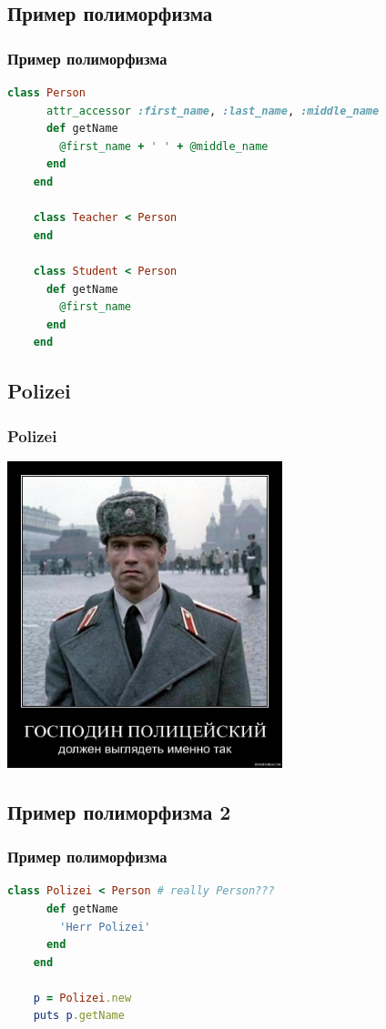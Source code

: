 \documentclass[compress,red]{beamer}
\begin{document}
\subsection{Пример полиморфизма}
\begin{frame}[fragile]
  \frametitle{Пример полиморфизма}
  \scriptsize{
  \begin{lstlisting}[language=ruby,basicstyle=\footnotesize,label=ruby6,caption=Полиморфизм]
    class Person
      attr_accessor :first_name, :last_name, :middle_name
      def getName
        @first_name + ' ' + @middle_name
      end
    end
    
    class Teacher < Person
    end
    
    class Student < Person
      def getName
        @first_name
      end
    end
  \end{lstlisting}
  }
  
\end{frame}

\subsection{Polizei}
\begin{frame}[fragile]
  \frametitle{Polizei}
  \centerline{\includegraphics[width=0.6\textwidth]{images/herr_polizei.jpg}}
\end{frame}

\subsection{Пример полиморфизма 2}
\begin{frame}[fragile]
  \frametitle{Пример полиморфизма}
  \scriptsize{
  \begin{lstlisting}[language=ruby,basicstyle=\footnotesize,label=ruby7,caption=Полиморфизм]
    class Polizei < Person # really Person???
      def getName
        'Herr Polizei'
      end
    end
    
    p = Polizei.new
    puts p.getName
    
  \end{lstlisting}
  }
  
\end{frame}
\end{document}
